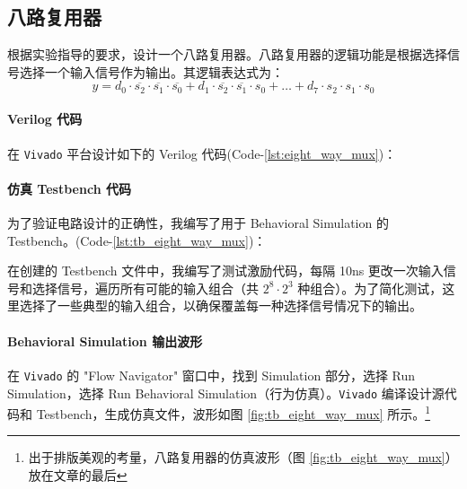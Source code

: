 \documentclass[10pt,a4paper,twoside]{rho-class/rho}
\begin{document}
    \subsection{八路复用器}
        根据实验指导的要求，设计一个八路复用器。八路复用器的逻辑功能是根据选择信号选择一个输入信号作为输出。其逻辑表达式为：
        \[
        y = d_0 \cdot \overline{s_2} \cdot \overline{s_1} \cdot \overline{s_0} + d_1 \cdot \overline{s_2} \cdot \overline{s_1} \cdot s_0 + \dots + d_7 \cdot s_2 \cdot s_1 \cdot s_0
        \]
        
        
        \paragraph{Verilog 代码}
        
        在 \verb|Vivado| 平台设计如下的 Verilog 代码(Code-\ref{lst:eight_way_mux})：
                

        
        \paragraph{仿真 Testbench 代码}
        
            为了验证电路设计的正确性，我编写了用于 Behavioral Simulation 的 Testbench。(Code-\ref{lst:tb_eight_way_mux})：
                
        
        
            在创建的 Testbench 文件中，我编写了测试激励代码，每隔 10ns 更改一次输入信号和选择信号，遍历所有可能的输入组合（共 $2^8 \cdot 2^3$ 种组合）。为了简化测试，这里选择了一些典型的输入组合，以确保覆盖每一种选择信号情况下的输出。
        
        \paragraph{Behavioral Simulation 输出波形}
        
            在 \verb|Vivado| 的 "Flow Navigator" 窗口中，找到 Simulation 部分，选择 Run Simulation，选择 Run Behavioral Simulation（行为仿真）。\verb|Vivado| 编译设计源代码和 Testbench，生成仿真文件，波形如图 \ref{fig:tb_eight_way_mux} 所示。\footnote{出于排版美观的考量，八路复用器的仿真波形（图 \ref{fig:tb_eight_way_mux}）放在文章的最后}
        
\end{document}
